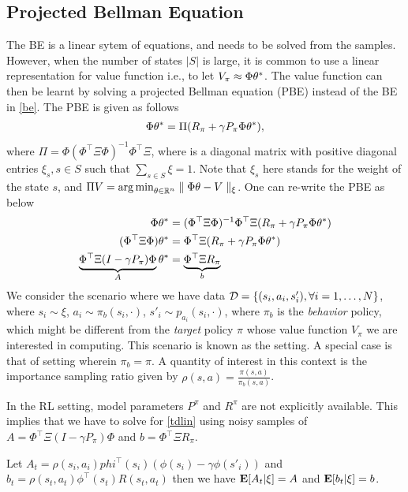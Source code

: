\subsection{Projected Bellman Equation}
The BE is a linear sytem of equations, and needs to be solved from the samples. However, when the number of states $|S|$ is large, it is common to use a linear representation for value function i.e., to let $V_\pi\approx\Phi \theta^*$. The value function can then be learnt by solving a projected Bellman equation (PBE) instead of the BE in \eqref{be}. The PBE is given as follows
\begin{align}
\Phi\theta^*=\Pi (R_\pi+\gamma P_\pi \Phi \theta^*),
\end{align}
where $\Pi=\Phi(\Phi^\top \Xi\Phi)^{-1}\Phi^\top\Xi$, where is a diagonal matrix with positive diagonal entries $\xi_{s}, s\in S$ such that $\sum_{s\in S} \xi=1$. Note that $\xi_s$ here stands for the weight of the state $s$, and $\Pi V= {\arg\min}_{\theta\in \mathbb{R}^n}\parallel \Phi \theta -V\parallel_{\xi}$. One can re-write the PBE as below
\begin{align}\label{tdlin}
\Phi\theta^*&= (\Phi^\top \Xi\Phi)^{-1}\Phi^\top\Xi (R_\pi+\gamma P_\pi \Phi \theta^*)\nonumber\\
(\Phi^\top \Xi\Phi)\theta^*&= \Phi^\top\Xi (R_\pi+\gamma P_\pi \Phi \theta^*)\nonumber\\
\underbrace{\Phi^\top \Xi(I-\gamma P_\pi)\Phi}_{A}\theta^*&= \underbrace{\Phi^\top\Xi R_\pi}_{b}
\end{align}
We consider the scenario where we have data $\mathcal{D}=\{(s_i,a_i,s'_i),\forall i=1,\ldots,N\}$, where $s_i\sim \xi$, $a_i\sim \pi_b(s_i,\cdot)$, $s'_i\sim p_{a_i}(s_i,\cdot)$, where $\pi_b$ is the \emph{behavior} policy, which might be different from the \emph{target} policy $\pi$ whose value function $V_\pi$ we are interested in computing. This scenario is known as the \ofp setting. A special case is that of \onp setting wherein $\pi_b=\pi$. A quantity of interest in this context is the importance sampling ratio given by $\rho(s,a)=\frac{\pi(s,a)}{\pi_b(s,a)}$.\par
In the RL setting, model parameters $P^\pi$ and $R^\pi$ are not explicitly available. This implies that we have to solve for \eqref{tdlin} using noisy samples of $A=\Phi^\top \Xi(I-\gamma P_\pi)\Phi$ and $b=\Phi^\top\Xi R_\pi$.\par
\begin{lemma}
Let $A_t=\rho(s_i,a_i)phi^\top(s_i)(\phi(s_i)-\gamma \phi(s'_i))$ and $b_t=\rho(s_t,a_t)\phi^\top(s_t) R(s_t,a_t)$ then we have $\mathbf{E}[A_t|\xi]=A$ and $\mathbf{E}[b_t|\xi]=b$.
\end{lemma}
